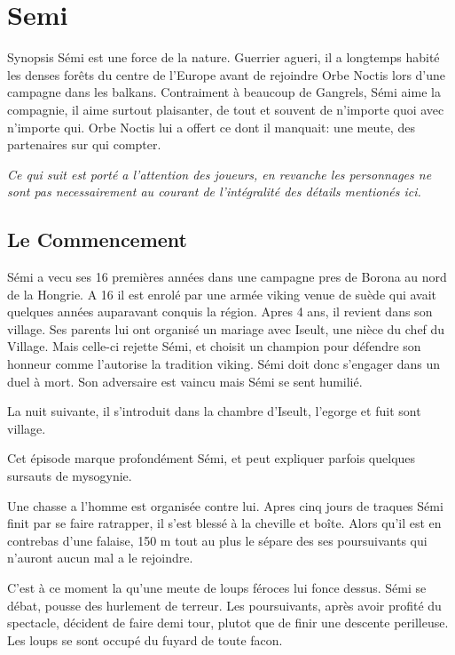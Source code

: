 \twocolumn

\chapter{Semi}

\begin{commentbox}{Synopsis}
Sémi est une force de la nature. Guerrier agueri, il a longtemps habité les denses forêts
du centre de l'Europe avant de rejoindre Orbe Noctis lors d'une campagne dans les balkans.
Contraiment à beaucoup de Gangrels, Sémi aime la compagnie, il aime surtout plaisanter,
de tout et souvent de n'importe quoi avec n'importe qui. Orbe Noctis lui a offert ce dont il
manquait: une meute, des partenaires sur qui compter.
\end{commentbox}

\textit{Ce qui suit est porté a l'attention des joueurs, en revanche les personnages ne sont pas necessairement au courant de l'intégralité des détails mentionés ici.}

\section {Le Commencement}
Sémi a vecu ses 16 premières années dans une campagne pres de Borona au nord de la Hongrie. A 16 il est enrolé par une armée viking venue de suède qui avait quelques années auparavant conquis la région. Apres 4 ans, il revient dans son village. Ses parents lui ont organisé un mariage avec Iseult, une nièce du chef du Village. Mais celle-ci rejette Sémi, et choisit un champion pour défendre son honneur comme l'autorise la tradition viking. Sémi doit donc s'engager dans un duel à mort. Son adversaire est vaincu mais Sémi se sent humilié.

La nuit suivante, il s'introduit dans la chambre d'Iseult, l'egorge et fuit sont village.

\begin{quotebox}
Cet épisode marque profondément Sémi, et peut expliquer parfois quelques sursauts de mysogynie.
\end{quotebox}


Une chasse a l'homme est organisée contre lui. Apres cinq jours de traques Sémi finit par se faire ratrapper, il s'est blessé à la cheville et boîte.
Alors qu'il est en contrebas d'une falaise, 150 m tout au plus le sépare des ses poursuivants
qui n'auront aucun mal a le rejoindre. 

C'est à ce moment la qu'une meute de loups féroces lui fonce dessus. Sémi se débat, 
pousse des hurlement de terreur. Les poursuivants, après avoir profité du spectacle, 
décident de faire demi tour, plutot que de finir une descente perilleuse. Les loups
se sont occupé du fuyard de toute facon.

